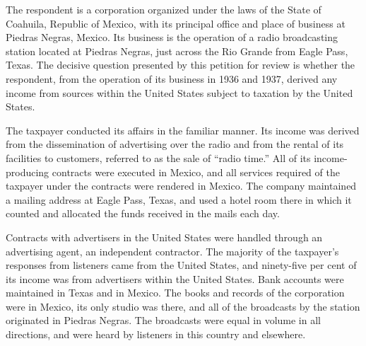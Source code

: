 \begin{select}
The respondent is a corporation organized under the laws of the State of Coahuila, Republic of Mexico, with its principal office and place of business at Piedras Negras, Mexico. Its business is the operation of a radio broadcasting station located at Piedras Negras, just across the Rio Grande from Eagle Pass, Texas. The decisive question presented by this petition for review is whether the respondent, from the operation of its business in 1936 and 1937, derived any income from sources within the United States subject to taxation by the United States.

The taxpayer conducted its affairs in the familiar manner. Its income was derived from the dissemination of advertising over the radio and from the rental of its facilities to customers, referred to as the sale of ``radio time.''  All of its income-producing contracts were executed in Mexico, and all services required of the taxpayer under the contracts were rendered in Mexico. The company maintained a mailing address at Eagle Pass, Texas, and used a hotel room there in which it counted and allocated the funds received in the mails each day.

Contracts with advertisers in the United States were handled through an advertising agent, an independent contractor. The majority of the taxpayer's responses from listeners came from the United States, and ninety-five per cent of its income was from advertisers within the United States. Bank accounts were maintained in Texas and in Mexico. The books and records of the corporation were in Mexico, its only studio was there, and all of the broadcasts by the station originated in Piedras Negras. The broadcasts were equal in volume in all directions, and were heard by listeners in this country and elsewhere.


\end{select}
